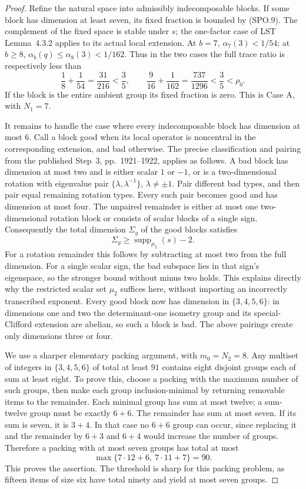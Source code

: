 \begin{proof}
Refine the natural space into admissibly indecomposable blocks.
If some block has dimension at least seven, its fixed fraction
is bounded by (SPO.9).  The complement of the fixed space is
stable under $s$; the one-factor case of LST Lemma~4.3.2 applies
to its actual local extension.  At $b=7$,
$\alpha_7(3)<1/54$; at $b\ge8$, $\alpha_b(q)\le\alpha_8(3)<1/162$.
Thus in the two cases the full trace ratio is respectively less than
\[
 \frac18+\frac1{54}=\frac{31}{216}<\frac35,
 \qquad
 \frac9{16}+\frac1{162}=\frac{737}{1296}<\frac35<\rho_0.
 \tag{SPO.12}
\]
If the block is the entire ambient group its fixed fraction is zero.
This is Case A, with $N_1=7$.

It remains to handle the case where every indecomposable block
has dimension at most $6$.
Call a block good when its local operator is noncentral in
the corresponding extension, and bad otherwise.
The precise classification and pairing from the published
Step~3, pp.~1921--1922, applies as follows.
A bad block has dimension at most two and is either scalar
$1$ or $-1$, or is a two-dimensional rotation with eigenvalue
pair $\{\lambda,\lambda^{-1}\}$, $\lambda\ne\pm1$.
Pair different bad types, and then pair equal remaining
rotation types.  Every such pair becomes good and has
dimension at most four.  The unpaired remainder is either
at most one two-dimensional rotation block or consists
of scalar blocks of a single sign.
Consequently the total dimension $\Sigma_g$ of the good
blocks satisfies
\[
              \Sigma_g\ge\operatorname{supp}_{\mu_2}(s)-2.
 \tag{SPO.13}
\]
For a rotation remainder this follows by subtracting at most
two from the full dimension.  For a single scalar sign,
the bad subspace lies in that sign's eigenspace, so the
stronger bound without minus two holds.  This explains
directly why the restricted scalar set $\mu_2$ suffices
here, without importing an incorrectly transcribed exponent.
Every good block now has dimension in $\{3,4,5,6\}$:
in dimensions one and two the determinant-one isometry group
and its special-Clifford extension are abelian, so such a block
is bad.  The above pairings create only dimensions three or four.

We use a sharper elementary packing argument, with $m_0=N_2=8$.
Any multiset of integers in $\{3,4,5,6\}$ of total at least $91$
contains eight disjoint groups each of sum at least eight.
To prove this, choose a packing with the maximum number of such
groups, then make each group inclusion-minimal by returning
removable items to the remainder.  Each minimal group has sum
at most twelve; a sum-twelve group must be exactly $6+6$.
The remainder has sum at most seven.  If its sum is seven,
it is $3+4$.  In that case no $6+6$ group can occur, since
replacing it and the remainder by $6+3$ and $6+4$ would increase
the number of groups.  Therefore a packing with at most seven
groups has total at most
\[
 \max\{7\cdot12+6,\ 7\cdot11+7\}=90.
 \tag{SPO.14}
\]
This proves the assertion.  The threshold is sharp for this
packing problem, as fifteen items of size six have total ninety
and yield at most seven groups.


\end{proof}
